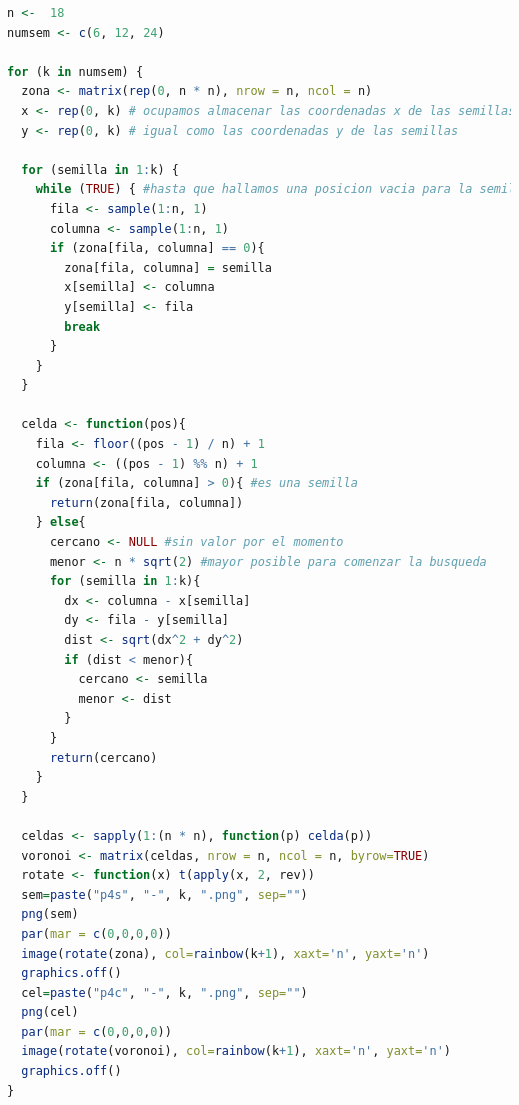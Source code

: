 \documentclass{article}
\begin{document}
\lstset{style=mystyle}
\begin{lstlisting}[language=R, caption= Código para varíar la cantidad de semillas $k$.]
n <-  18
numsem <- c(6, 12, 24)

for (k in numsem) {
  zona <- matrix(rep(0, n * n), nrow = n, ncol = n)
  x <- rep(0, k) # ocupamos almacenar las coordenadas x de las semillas
  y <- rep(0, k) # igual como las coordenadas y de las semillas
  
  for (semilla in 1:k) {
    while (TRUE) { #hasta que hallamos una posicion vacia para la semilla
      fila <- sample(1:n, 1)
      columna <- sample(1:n, 1)
      if (zona[fila, columna] == 0){
        zona[fila, columna] = semilla
        x[semilla] <- columna
        y[semilla] <- fila
        break
      }
    }
  }
  
  celda <- function(pos){
    fila <- floor((pos - 1) / n) + 1
    columna <- ((pos - 1) %% n) + 1
    if (zona[fila, columna] > 0){ #es una semilla
      return(zona[fila, columna])
    } else{
      cercano <- NULL #sin valor por el momento
      menor <- n * sqrt(2) #mayor posible para comenzar la busqueda
      for (semilla in 1:k){
        dx <- columna - x[semilla]
        dy <- fila - y[semilla]
        dist <- sqrt(dx^2 + dy^2)
        if (dist < menor){
          cercano <- semilla
          menor <- dist
        }
      }
      return(cercano)
    }
  }
  
  celdas <- sapply(1:(n * n), function(p) celda(p))
  voronoi <- matrix(celdas, nrow = n, ncol = n, byrow=TRUE)
  rotate <- function(x) t(apply(x, 2, rev))
  sem=paste("p4s", "-", k, ".png", sep="")
  png(sem)
  par(mar = c(0,0,0,0))
  image(rotate(zona), col=rainbow(k+1), xaxt='n', yaxt='n')
  graphics.off()
  cel=paste("p4c", "-", k, ".png", sep="")
  png(cel)
  par(mar = c(0,0,0,0))
  image(rotate(voronoi), col=rainbow(k+1), xaxt='n', yaxt='n')
  graphics.off()
}

\end{lstlisting}
\end{document}
